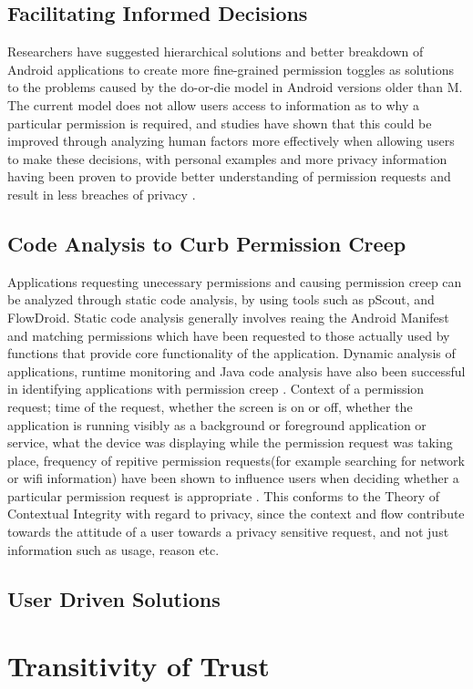 \subsection{Facilitating Informed Decisions}
Researchers have suggested hierarchical solutions\cite{barrera2010methodology} and better breakdown of Android applications to create more fine-grained permission toggles\cite{bugiel2013flexible} as solutions to the problems caused by the do-or-die model in Android versions older than M. The current model does not allow users access to information as to why a particular permission is required, and studies have shown that this could be improved through analyzing human factors more effectively when allowing users to make these decisions, with personal examples and more privacy information having been proven to provide better understanding of permission requests and result in less breaches of privacy\cite{kelley2013privacy} \cite{harbach2014using}.  

\subsection{Code Analysis to Curb Permission Creep}
Applications requesting unecessary permissions and causing permission creep can be analyzed through static code analysis, by using tools such as pScout\cite{au2012pscout}, and FlowDroid\cite{arzt2014flowdroid}. Static code analysis generally involves reaing the Android Manifest and matching permissions which have been requested to those actually used by functions that provide core functionality of the application. Dynamic analysis of applications, runtime monitoring and Java code analysis have also been successful in identifying applications with permission creep \cite{spreitzenbarth2013mobile}. Context of a permission request; time of the request, whether the screen is on or off, whether the application is running visibly as a background or foreground application or service, what the device was displaying while the permission request was taking place, frequency of repitive permission requests(for example searching for network or wifi information) have been shown to influence users when deciding whether a particular permission request is appropriate \cite{wijesekera2015android}. This conforms to the Theory of Contextual Integrity\cite{nissenbaum2004privacy} with regard to privacy, since the context and flow contribute towards the attitude of a user towards a privacy sensitive request, and not just information such as usage, reason etc.

\subsection{User Driven Solutions}



\section{Transitivity of Trust}